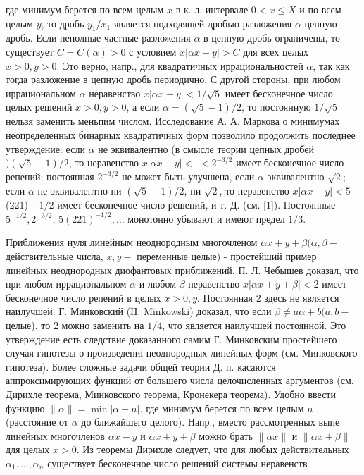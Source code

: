 \documentclass[10pt]{article}
\begin{document}
где минимум берется по всем целым $x$ в к.-л. интервале $0<x \leqslant X$ и по всем целым $y$, то дробь $y_{1} / x_{1}$ является подходящей дробью разложения $\alpha$ цепную дробь. Если неполные частные разложения $\alpha$ в цепную дробь ограничены, то существует $C=C(\alpha)>0$ с условием $x|\alpha x-y|>C$ для всех целых $x>0, y>0$. Это верно, напр., для квадратичных иррациональностей $\alpha$, так как тогда разложение в цепную дробь периодично. С другой стороны, при любом иррациональном $\alpha$ неравенство $x|\alpha x-y|<1 / \sqrt{5}$ имеет бесконечное число целых решений $x>0, y>0$, а если $\alpha=(\sqrt{5}-1) / 2$, то постоянную $1 / \sqrt{5}$ нельзя заменить меньпим числом. Исследование А. А. Маркова о минимумах неопределенных бинарных квадратичных форм позволило продолжить последнее утверждение: если $\alpha$ не эквивалентно (в смысле теории цепных дробей $)(\sqrt{5}-1) / 2$, то неравенство $x|\alpha x-y|<$ $<2^{-3 / 2}$ имеет бесконечное число репений; постоянная $2^{-3 / 2}$ не может быть улучшена, если $\alpha$ эквивалентно $\sqrt{2}$; если $\alpha$ не эквивалентно ни $(\sqrt{5}-1) / 2$, ни $\sqrt{2}$, то неравенство $x|\alpha x-y|<5$ (221) $-1 / 2$ имеет бесконечное число решений, и т. Д. (см. [1]). Постоянные $5^{-1 / 2}, 2^{-3 / 2}$, $5(221)^{-1 / 2}, \ldots$ монотонно убывают и имеют предел $1 / 3$.



Приближения нуля линейным неоднородным многочленом $\alpha x+y+\beta(\alpha, \beta-$ действительные числа, $x, y-$ переменные целые) - простейший пример линейных неоднородных диофантовых приближений. П. Л. Чебышев доказал, что при любом иррациональном $\alpha$ и любом $\beta$ неравенство $x|\alpha x+y+\beta|<2$ имеет бесконечное число репений в целых $x>0, y$. Постоянная 2 здесь не является наилучшей: Г. Минковский (H. Minkowski) доказал, что если $\beta \neq a \alpha+b(a, b-$ целые), то 2 можно заменить на $1 / 4$, что является наилучшей постоянной. Это утверждение есть следствие доказанного самим Г. Минковским простейшего случая гипотезы о произведениі неоднородных линейных форм (см. Минковского гипотеза). Более сложные задачи общей теории Д. п. касаются аппроксимирующих функций от большего числа целочисленных аргументов (см. Дирихле теорема, Минковского теорема, Кронекера теорема). Удобно ввести функцию $\|\alpha\|=\min |\alpha-n|$, где минимум берется по всем целым $n$ (расстояние от $\alpha$ до ближайшего целого). Напр., вместо рассмотренных выпе линейных многочленов $\alpha x-y$ и $\alpha x+y+\beta$ можно брать $\|\alpha x\|$ и $\|\alpha x+\beta\|$ для целых $x>0$. Из теоремы Дирихле следует, что для любых действительных $\alpha_{1}, \ldots, \alpha_{n}$ существует бесконечное число решений системы неравенств
\end{document}
